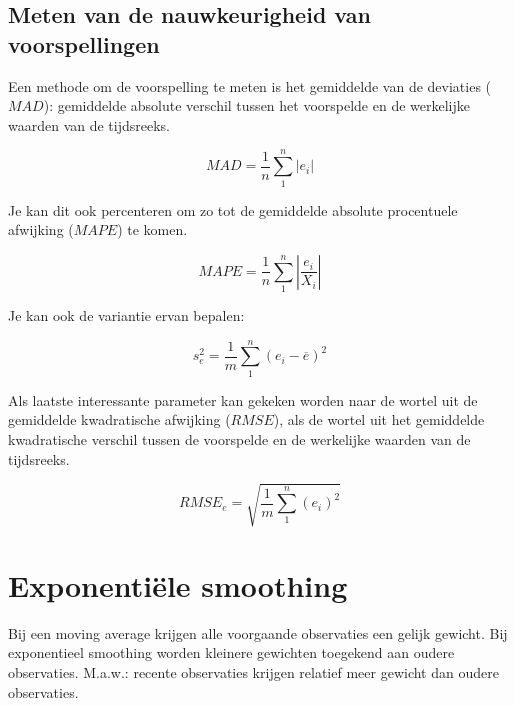 \subsection{Meten van de nauwkeurigheid van voorspellingen}

Een methode om de voorspelling te meten is het gemiddelde van de deviaties ($MAD$): gemiddelde absolute verschil tussen het voorspelde en de werkelijke waarden van de tijdsreeks.

\begin{definition}[$MAD$]
\begin{equation}
	MAD = \frac{1}{n} \sum_{1}^{n} \left| e_{i} \right|  
\label{eq:MAD}
\end{equation}
\end{definition}

Je kan dit ook percenteren om zo tot de gemiddelde absolute procentuele afwijking ($MAPE$) te komen.

\begin{definition}[$MAPE$]
\begin{equation}
	MAPE = \frac{1}{n} \sum_{1}^{n} \left| \frac{e_{i}}{X_i} \right|  
\label{eq:MAD2}
\end{equation}
\end{definition}


Je kan ook de variantie ervan bepalen:

\begin{definition}[$VAR$]
\begin{equation}
	s^{2}_{e} = \frac{1}{m} \sum_{1}^{n} (e_{i} - \overline{e})^{2}
\label{eq:varError}
\end{equation}
\end{definition}

Als laatste interessante parameter kan gekeken worden naar de wortel uit de gemiddelde kwadratische afwijking ($RMSE$), als de wortel uit het gemiddelde kwadratische verschil tussen de voorspelde en de werkelijke waarden van de tijdsreeks.

\begin{definition}[$RMSE$]
\begin{equation}
	RMSE_{e} = \sqrt{\frac{1}{m} \sum_{1}^{n} (e_{i})^{2}}
\label{eq:varError2}
\end{equation}
\end{definition}


\section{Exponenti\"ele smoothing}
Bij een moving average krijgen alle voorgaande observaties een gelijk gewicht. Bij exponentieel smoothing worden kleinere gewichten toegekend aan oudere observaties. M.a.w.: recente observaties krijgen relatief meer gewicht dan oudere observaties.

